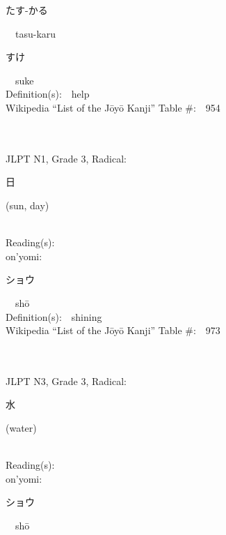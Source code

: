 \begin{multicols}{2}
{\hspace*{2em}}{\begin{CJK}{UTF8}{min} たす-かる \end{CJK}}\ \ tasu-karu\ \ \\
{\hspace*{2em}}{\begin{CJK}{UTF8}{min} すけ \end{CJK}}\ \ suke\ \ \\
Definition(s):\ \ help \\
Wikipedia ``List of the J\=oy\=o Kanji'' Table \#:\ \ 954 \\
\ \ \\
{\fontsize{34pt}{40pt}  }\ \ \\  %
{JLPT N1, Grade 3, Radical:\ \ {\begin{CJK}{UTF8}{min} 日 \end{CJK}} (sun, day) } \\
Reading(s):\ \ \\
{\hspace*{1em}}on'yomi:\ \ \\
{\hspace*{2em}}{\begin{CJK}{UTF8}{min} ショウ \end{CJK}}\ \ sh\=o\ \ \\
Definition(s):\ \ shining \\
Wikipedia ``List of the J\=oy\=o Kanji'' Table \#:\ \ 973 \\
\ \ \\
{\fontsize{34pt}{40pt}  }\ \ \\  %
{JLPT N3, Grade 3, Radical:\ \ {\begin{CJK}{UTF8}{min} 水 \end{CJK}} (water) } \\
Reading(s):\ \ \\
{\hspace*{1em}}on'yomi:\ \ \\
{\hspace*{2em}}{\begin{CJK}{UTF8}{min} ショウ \end{CJK}}\ \ sh\=o\ \ \\

\end{multicols}
